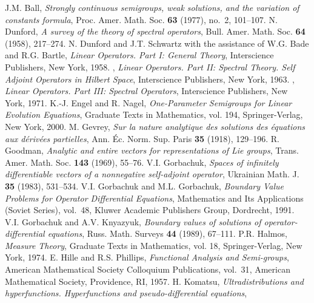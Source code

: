 \documentclass{amsart}
\theoremstyle{plain}
\theoremstyle{definition}
\begin{document}
\begin{thebibliography}{99}
{J.M. Ball},	
\textit{Strongly continuous semigroups, weak solutions, and the variation of constants formula},	
{Proc. Amer. Math. Soc.}	
\textbf{63}	
{(1977)},	
{no.~2},	
{101--107}.	
{N. Dunford},	
\textit{A survey of the theory of spectral operators}, 
{Bull. Amer. Math. Soc.}	
\textbf{64}	
{(1958)},	
{217--274}.	
{N. Dunford and J.T. Schwartz with the assistance of W.G. Bade and R.G. Bartle},	
\textit{Linear Operators. Part I: General Theory},	
{Interscience Publishers},	
{New York},		
{1958}.		
{\bysame},	
\textit{Linear Operators. Part II: Spectral Theory. Self Adjoint Operators in Hilbert Space}, 
{Interscience Publishers},	
{New York},		
{1963}.		
{\bysame},	
\textit{Linear Operators. Part III: Spectral Operators}, 
{Interscience Publishers},	
{New York},		
{1971}.		
{K.-J. Engel and R. Nagel},	
\textit{One-Parameter Semigroups
for Linear Evolution Equations}, 
{Graduate Texts in Mathematics, vol. 194},	
{Springer-Verlag},	
{New York},		
{2000}.		
{M. Gevrey},	
\textit{Sur la nature analytique des solutions 
des  \'equations aux d\'eriv\'ees partielles},	
{Ann. \'Ec. Norm. Sup. Paris}	
\textbf{35}	
{(1918)},	
{129--196}.	
{R. Goodman},	
\textit{Analytic and entire vectors for representations of Lie groups},	
{Trans. Amer. Math. Soc.}	
\textbf{143}	
{(1969)},	
{55--76}.	
{V.I. Gorbachuk},	
\textit{Spaces of infinitely differentiable vectors of a nonnegative self-adjoint operator},	
{Ukrainian Math. J.}	
\textbf{35}	
{(1983)},	
{531--534}.	
{V.I. Gorbachuk and M.L. Gorbachuk},	
\textit{Boundary Value Problems for Operator Differential Equations},	
{Mathematics and Its Applications (Soviet Series), vol.~48},	
{Kluwer Academic Publishers Group},	
{Dordrecht},		
{1991}.		
{V.I. Gorbachuk and A.V. Knyazyuk},	
\textit{Boundary values of solutions of op\-erator-differential equations},	
{Russ. Math. Surveys}	
\textbf{44}	
{(1989)},	
{67--111}.	
{P.R. Halmos},	
\textit{Measure Theory}, 
{Graduate Texts in Mathematics, vol. 18},	
{Springer-Verlag},	
{New York},		
{1974}.		
{E. Hille and R.S. Phillips},	
\textit{Functional Analysis and Semi-groups},	
{American Mathematical Society Colloquium Publications, vol.~31},	
{American Mathematical Society},	
{Providence, RI},		
{1957}.		
{H. Komatsu},	
\textit{Ultradistributions and hyperfunctions. Hyperfunctions and pseudo-differential equations},	

\end{thebibliography}
\end{document}
